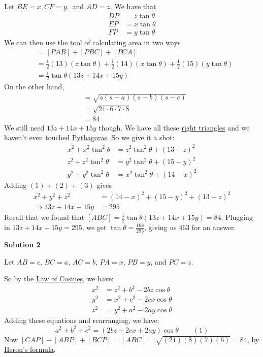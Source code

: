 \begin{enumerate}
 Let $BE = x, CF = y,$ and $AD = z$.  We have that
 \begin{align*}DP&=z\tan\theta\\ EP&=x\tan\theta\\ FP&=y\tan\theta\end{align*}
We can then use the tool of calculating area in two ways
 \begin{align*}[ABC]&=[PAB]+[PBC]+[PCA]\\ &=\frac{1}{2}(13)(z\tan\theta)+\frac{1}{2}(14)(x\tan\theta)+\frac{1}{2}(15)(y\tan\theta)\\ &=\frac{1}{2}\tan\theta(13z+14x+15y)\end{align*}
On the other hand,
 \begin{align*}[ABC]&=\sqrt{s(s-a)(s-b)(s-c)}\\ &=\sqrt{21\cdot6\cdot7\cdot8}\\ &=84\end{align*}
We still need $13z+14x+15y$ though. We have all these \href{https://artofproblemsolving.com/wiki/index.php?title=Right\_triangle}{right triangles} and we haven't even touched \href{https://artofproblemsolving.com/wiki/index.php?title=Pythagorean\_theorem}{Pythagoras}. So we give it a shot:
 \begin{align}x^2+x^2\tan^2\theta&=z^2\tan^2\theta+(13-z)^2\\ z^2+z^2\tan^2\theta&=y^2\tan^2\theta+(15-y)^2\\ y^2+y^2\tan^2\theta&=x^2\tan^2\theta+(14-x)^2\end{align}Adding $(1) + (2) + (3)$ gives
 \begin{align*}x^2+y^2+z^2&=(14-x)^2+(15-y)^2+(13-z)^2\\ \Rightarrow13z+14x+15y&=295\end{align*}
Recall that we found that $[ABC]=\frac{1}{2}\tan\theta(13z+14x+15y)=84$. Plugging in $13z+14x+15y=295$, we get $\tan\theta=\frac{168}{295}$, giving us $\boxed{463}$ for an answer.

 



\textbf{Solution 2}

Let $AB=c$, $BC=a$, $AC=b$, $PA=x$, $PB=y$, and $PC=z$.

 So by the \href{https://artofproblemsolving.com/wiki/index.php?title=Law\_of\_Cosines}{Law of Cosines}, we have:
 \begin{align*}x^2 &= z^2 + b^2 - 2bz\cos{\theta}\\ y^2 &= x^2 + c^2 - 2cx\cos{\theta}\\ z^2 &= y^2 + a^2 - 2ay\cos{\theta}\end{align*}
Adding these equations and rearranging, we have:
 \[a^2 + b^2 + c^2 = (2bz + 2cx + 2ay)\cos{\theta}\qquad(1)\]Now $[CAP] + [ABP] + [BCP] = [ABC] = \sqrt {(21)(8)(7)(6)} = 84$, by \href{https://artofproblemsolving.com/wiki/index.php?title=Heron\%27s\_formula}{Heron's formula}.


\end{enumerate}
